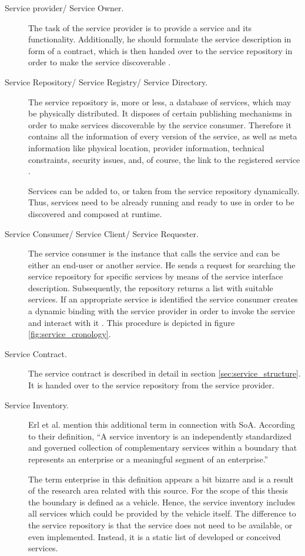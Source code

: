 \begin{description}
\item [Service provider/ Service Owner.] 
The task of the service provider is to provide a service and its functionality. Additionally, he should formulate the service description in form of a contract, which is then handed over to the service repository in order to make the service discoverable \cite{breivold}.

\item [Service Repository/ Service Registry/ Service Directory.]
The service repository is, more or less, a database of services, which may be physically distributed. It disposes of certain publishing mechanisms in order to make services discoverable by the service consumer. Therefore it contains all the information of every version of the service, as well as meta information like physical location, provider information, technical constraints, security issues, and, of course, the link to the registered service \cite[p.60-61]{krafzig} \cite{breivold} \cite{converge}.

Services can be added to, or taken from the service repository dynamically. Thus, services need to be already running and ready to use in order to be discovered and composed at runtime.

\item [Service Consumer/ Service Client/ Service Requester.]
The service consumer is the instance that calls the service and can be either an end-user or another service. He sends a request for searching the service repository for specific services by means of the service interface description. Subsequently, the repository returns a list with suitable services. If an appropriate service is identified the service consumer creates a dynamic binding with the service provider in order to invoke the service and interact with it \cite{breivold} \cite{converge}. This procedure is depicted in figure \ref{fig:service_cronology}.

\item [Service Contract.]
The service contract is described in detail in section \ref{sec:service_structure}. It is handed over to the service repository from the service provider.

\item [Service Inventory.]
Erl et al. \cite[p.41]{erl2011} mention this additional term in connection with SoA. According to their definition, ``A service inventory is an independently standardized and governed collection of complementary services within a boundary that represents an enterprise or a meaningful segment of an enterprise.'' 

The term enterprise in this definition appears a bit bizarre and is a result of the research area related with this source. For the scope of this thesis the boundary is defined as a vehicle. Hence, the service inventory includes all services which could be provided by the vehicle itself. The difference to the service repository is that the service does not need to be available, or even implemented. Instead, it is a static list of developed or conceived services.
\end{description}

